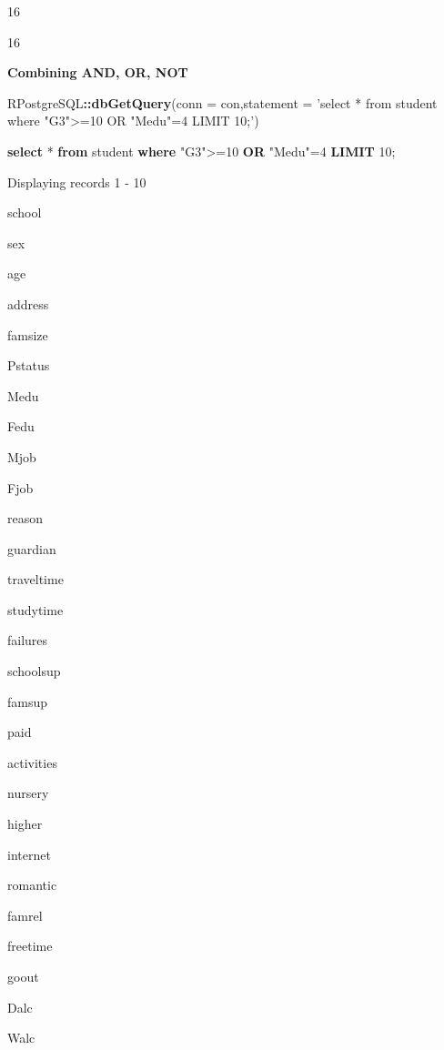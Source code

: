 \documentclass[]{book}
\newenvironment{Shaded}{\begin{snugshade}}{\end{snugshade}}
\newcommand{\KeywordTok}[1]{\textcolor[rgb]{0.13,0.29,0.53}{\textbf{#1}}}
\newcommand{\DataTypeTok}[1]{\textcolor[rgb]{0.13,0.29,0.53}{#1}}
\newcommand{\DecValTok}[1]{\textcolor[rgb]{0.00,0.00,0.81}{#1}}
\newcommand{\StringTok}[1]{\textcolor[rgb]{0.31,0.60,0.02}{#1}}
\newcommand{\OtherTok}[1]{\textcolor[rgb]{0.56,0.35,0.01}{#1}}
\newcommand{\OperatorTok}[1]{\textcolor[rgb]{0.81,0.36,0.00}{\textbf{#1}}}
\newcommand{\NormalTok}[1]{#1}
\begin{document}
16

16

\textbf{Combining AND, OR, NOT}

\begin{Shaded}
\begin{Highlighting}[]
\NormalTok{RPostgreSQL}\OperatorTok{::}\KeywordTok{dbGetQuery}\NormalTok{(}\DataTypeTok{conn =}\NormalTok{ con,}\DataTypeTok{statement =} \StringTok{'select * from student where "G3">=10 OR "Medu"=4 LIMIT 10;'}\NormalTok{)}
\end{Highlighting}
\end{Shaded}

\begin{Shaded}
\begin{Highlighting}[]
\KeywordTok{select}\NormalTok{ * }\KeywordTok{from}\NormalTok{ student }\KeywordTok{where} \OtherTok{"G3"}\NormalTok{>=}\DecValTok{10} \KeywordTok{OR} \OtherTok{"Medu"}\NormalTok{=}\DecValTok{4} \KeywordTok{LIMIT} \DecValTok{10}\NormalTok{;}
\end{Highlighting}
\end{Shaded}

\label{tab:unnamed-chunk-32}Displaying records 1 - 10

school

sex

age

address

famsize

Pstatus

Medu

Fedu

Mjob

Fjob

reason

guardian

traveltime

studytime

failures

schoolsup

famsup

paid

activities

nursery

higher

internet

romantic

famrel

freetime

goout

Dalc

Walc
\end{document}
